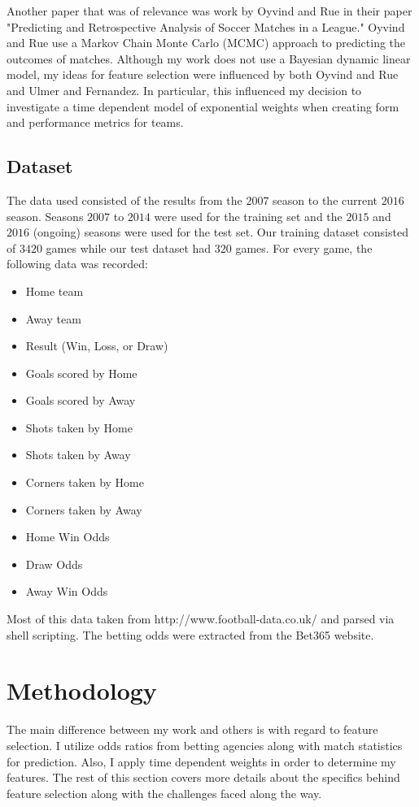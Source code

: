 \documentclass[paper=a4, fontsize=11pt]{scrartcl}
\numberwithin{equation}{section}		%
\numberwithin{figure}{section}			%
\numberwithin{table}{section}				%
\begin{document}
Another paper that was of relevance was work by Oyvind and Rue in their paper "Predicting and Retrospective Analysis of Soccer Matches in a League." Oyvind and Rue use a Markov Chain Monte Carlo (MCMC) approach to predicting the outcomes of matches. Although my work does not use a Bayesian dynamic linear model, my ideas for feature selection were influenced by both Oyvind and Rue and Ulmer and Fernandez. In particular, this influenced my decision to investigate a time dependent model of exponential weights when creating form and performance metrics for teams.

\subsection{Dataset}
The data used consisted of the results from the $2007$ season to the current $2016$ season. Seasons $2007$ to $2014$ were used for the training set and the $2015$ and $2016$ (ongoing) seasons were used for the test set. Our training dataset consisted of $3420$ games while our test dataset had $320$ games. For every game, the following data was recorded:

\begin{itemize}
\item Home team
\item Away team
\item Result (Win, Loss, or Draw)
\item Goals scored by Home
\item Goals scored by Away
\item Shots taken by Home
\item Shots taken by Away
\item Corners taken by Home
\item Corners taken by Away
\item Home Win Odds
\item Draw Odds
\item Away Win Odds
\end{itemize}

Most of this data taken from http://www.football-data.co.uk/ and parsed via shell scripting. The betting odds were extracted from the Bet365 website.

\section{Methodology}

The main difference between my work and others is with regard to feature selection. I utilize odds ratios from betting agencies along with match statistics for prediction. Also, I apply time dependent weights in order to determine my features. The rest of this section covers more details about the specifics behind feature selection along with the challenges faced along the way.
\end{document}

